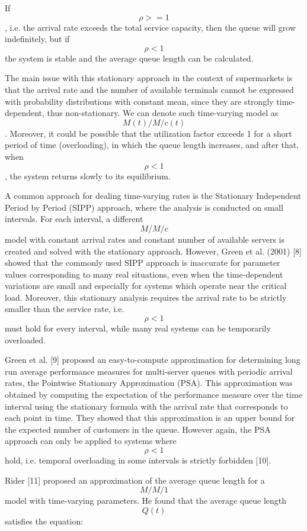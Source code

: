 If $$ \rho >= 1 $$, i.e. the arrival rate exceeds the total service capacity, then the queue will grow indefinitely, but if $$ \rho < 1 $$ the system is stable and the average queue length can be calculated.

The main issue with this stationary approach in the context of supermarkets is that the arrival rate and the number of available terminals cannot be expressed with probability distributions with constant mean, since they are strongly time-dependent, thus non-stationary. We can denote such time-varying model as $$ M(t)/M/c(t) $$. Moreover, it could be possible that the utilization factor exceeds 1 for a short period of time (overloading), in which the queue length increases, and after that, when $$ \rho < 1 $$, the system returns slowly to its equilibrium.

A common approach for dealing time-varying rates is the Stationary Independent Period by Period (SIPP) approach, where the analysis is conducted on small intervals. For each interval, a different $$ M/M/c $$ model with constant arrival rates and constant number of available servers is created and solved with the stationary approach. However, Green et al. (2001) [8] showed that the commonly used SIPP approach is inaccurate for parameter values corresponding to many real situations, even when the time-dependent variations are small and especially for systems which operate near the critical load. Moreover, this stationary analysis requires the arrival rate to be strictly smaller than the service rate, i.e. $$ \rho < 1 $$ must hold for every interval, while many real systems can be temporarily overloaded.

Green et al. [9] proposed an easy-to-compute approximation for determining long run average performance measures for multi-server queues with periodic arrival rates, the Pointwise Stationary Approximation (PSA). This approximation was obtained by computing the expectation of the performance measure over the time interval using the stationary formula with the arrival rate that corresponds to each point in time. They showed that this approximation is an upper bound for the expected number of customers in the queue. However again, the PSA approach can only be applied to systems where $$ \rho < 1 $$ hold, i.e. temporal overloading in some intervals is strictly forbidden [10].

Rider [11] proposed an approximation of the average queue length for a $$ M/M/1 $$ model with time-varying parameters. He found that the average queue length $$ Q(t) $$ satisfies the equation:

